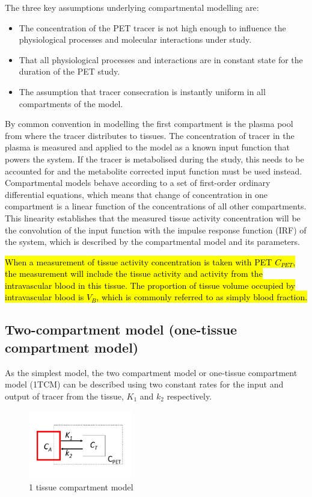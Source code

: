 The three key assumptions underlying compartmental modelling are:
\begin{itemize}
\item  The concentration of the PET tracer is not high enough to influence the physiological processes and molecular interactions under study. 
\item That all physiological processes and interactions are in constant state for the duration of the PET study. 
\item  The assumption that tracer consecration is instantly uniform in all compartments of the model.
\end{itemize}

By common convention in modelling the first compartment is the plasma pool from where the tracer distributes to tissues. The concentration of tracer in the plasma is measured and applied to the model as a known input function that powers the system. If the tracer is metabolised during the study, this needs to be accounted for and the metabolite corrected input function must be used instead. Compartmental models behave according to a set of first-order ordinary differential equations, which means that change of concentration in one compartment is a linear function of the concentrations of all other compartments. This linearity establishes that the measured tissue activity concentration will be the convolution of the input function with the impulse response function (IRF) of the system, which is described by the compartmental model and its parameters. \par
\hl{When a measurement of tissue activity concentration is taken with PET $C_{PET}$, the measurement will include the tissue activity and activity from the intravascular blood in this tissue. The proportion of tissue volume occupied by intravascular blood is $V_B$, which is commonly referred to as simply blood fraction.}\par

\subsection{Two-compartment model (one-tissue compartment model)}
As the simplest model, the two compartment model or one-tissue compartment model (1TCM) can be described using two constant rates for the input and output of tracer from the tissue, $K_1$ and $k_2$ respectively.

\begin{figure}[ht]
	\includegraphics[width=0.4\textwidth]{figures/1_1_1TCM.pdf}
	\centering
	\caption{1 tissue compartment model}
	\centering
	\label{fig:1TCM}
\end{figure}

